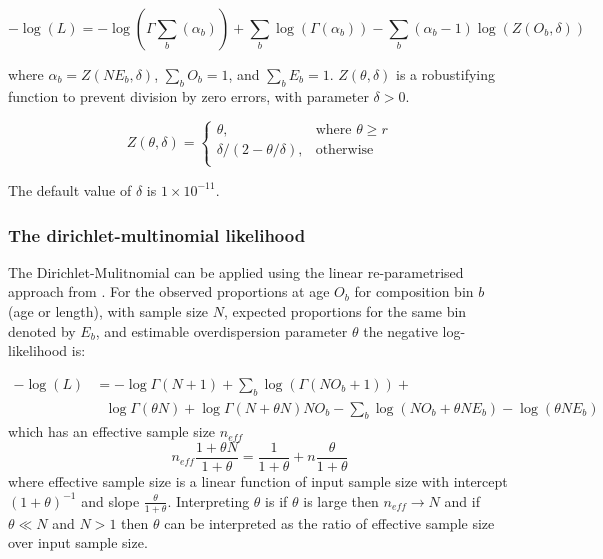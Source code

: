 \begin{equation}
-\log \left(L \right) = -\log(\Gamma \sum\limits_b (\alpha_b)) + \sum\limits_b \log(\Gamma (\alpha_b)) - \sum\limits_b (\alpha_b-1) \log(Z(O_b,\delta))
\end{equation}

where $\alpha_b = Z \left(N E_b,\delta \right)$, $\sum\limits_b O_b = 1$, and $\sum\limits_b E_b = 1$. $Z \left(\theta,\delta \right)$ is a robustifying function to prevent division by zero errors, with parameter $\delta>0$.

\begin{equation}
Z \left(\theta,\delta \right) = \begin{cases}
\theta, & \text{where $\theta \ge r$} \\
\delta/\left( 2-\theta/\delta \right), & \text{otherwise} \\
\end{cases}
\end{equation}

The default value of $\delta$ is $1 \times 10^{-11}$.

\subsubsection*{The dirichlet-multinomial likelihood}
The Dirichlet-Mulitnomial can be applied using the linear re-parametrised approach from \citep{thorson2017model}. For the observed proportions at age $O_b$ for composition bin $b$ (age or length), with sample size $N$, expected proportions for the same bin denoted by $E_b$, and estimable overdispersion parameter \(\theta\) the negative log-likelihood is:

\begin{align*}
-\log \left(L \right) &=  -\log \Gamma \left(N + 1 \right) + \sum\limits_b \log \left( \Gamma \left(NO_b + 1\right) \right) + \\
 & \ \ \ \log \Gamma \left(\theta N\right) + \log \Gamma \left(N + \theta N\right)  NO_b - \sum\limits_b \log (NO_b + \theta N E_b) - \log(\theta N E_b)
\end{align*}
which has an effective sample size \(n_{eff}\)
\[
n_{eff} \frac{1 + \theta N}{1 + \theta} = \frac{1}{1 + \theta} + n\frac{\theta}{1 + \theta}
\]
where effective sample size is a linear function of input sample size with intercept \((1 + \theta)^{-1}\)  and slope \(\frac{\theta}{1 + \theta}\). Interpreting \(\theta\) is if \(\theta\) is large then \(n_{eff} \rightarrow N\) and if \(\theta \ll N \) and \(N > 1\) then \(\theta\) can be interpreted as the ratio of effective sample size over input sample size.


